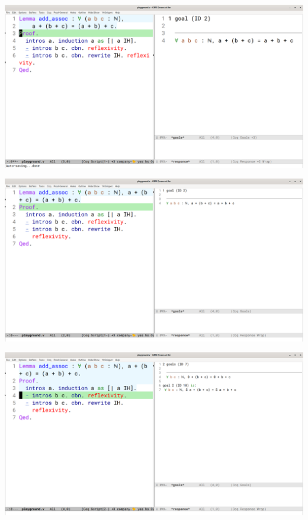 \documentclass{beamer}
\begin{document}
\begin{frame}[plain]
  \includegraphics[width=\linewidth]{slika1}
\end{frame}\addtocounter{framenumber}{-1}
\begin{frame}[plain]
  \includegraphics[width=\linewidth]{slika3}
\end{frame}\addtocounter{framenumber}{-1}
\begin{frame}[plain]
  \includegraphics[width=\linewidth]{slika5}
\end{frame}\addtocounter{framenumber}{-1}
\end{document}
